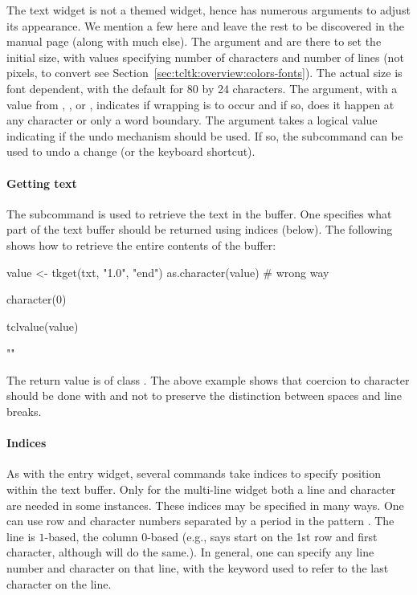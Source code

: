 The text widget is not a themed widget, hence has numerous arguments
to adjust its appearance. We mention a few here and leave the rest to
be discovered in the manual page (along with much else). The argument
 and  are there to
set the initial size, with values specifying number of characters and
number of lines (not pixels, to convert see
Section~\ref{sec:tcltk:overview:colors-fonts}). The actual size is
font dependent, with the default for 80 by 24 characters. The
 argument, with a value from ,
, or , indicates if wrapping is to occur and
if so, does it happen at any character or only a word boundary. The
argument  takes a logical value indicating if
the undo mechanism should be used. If so, the subcommand
 can be used to undo a change (or the
 keyboard shortcut).


\paragraph{Getting text}
The  subcommand is used to retrieve the text
in the buffer. One specifies what part of the text buffer should be
returned using indices (below). The following shows how to retrieve
the entire contents of the buffer:

\begin{Schunk}
\begin{Sinput}
 value <- tkget(txt, "1.0", "end")
 as.character(value)                     # wrong way
\end{Sinput}
\begin{Soutput}
character(0)
\end{Soutput}
\begin{Sinput}
 tclvalue(value)
\end{Sinput}
\begin{Soutput}
[1] "\n"
\end{Soutput}
\end{Schunk}

The return value is of class .  The above example shows
that coercion to character
should be done with  and not
 to preserve the distinction between spaces and
line breaks.


\paragraph{Indices}
As with the entry widget, several commands take indices to specify
position within the text buffer. Only for the multi-line widget both a
line and character are needed in some instances. These indices may be
specified in many ways. One can use row and character numbers
separated by a period in the pattern . The line is
$1$-based, the column $0$-based (e.g.,  says start on the
1st row and first character, although  will do the
same.). In general, one can specify any line number and character on
that line, with the keyword  used to refer to the last
character on the line.

